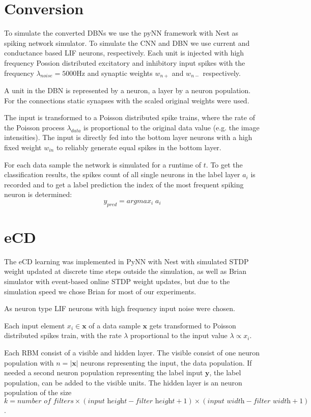 \section{Conversion}

To simulate the converted DBNs we use the pyNN framework with Nest as spiking network simulator.
To simulate the CNN and DBN we use current and conductance based LIF neurons, respectively.
Each unit is injected with high frequency Possion distributed excitatory and inhibitory input spikes with the frequency $\lambda_{noise}= 5000 \text{Hz}$ and synaptic weights $w_{n+}$ and $w_{n-}$ respectively.

A unit in the DBN is represented by a neuron, a layer by a neuron population.
For the connections static synapses with the scaled original weights were used. 

The input is transformed to a Poisson distributed spike trains, where the rate of the Poisson process $\lambda_{data}$ is proportional to the original data value (e.g. the image intensities). 
The input is directly fed into the bottom layer neurons with a high fixed weight $w_{in}$ to reliably generate equal spikes in the bottom layer.    

For each data sample the network is simulated for a runtime of $t$. 
To get the classification results, the spikes count of all single neurons in the label layer $a_i$ is recorded and to get a label prediction the index of the most frequent spiking neuron is determined:
\[
y_{pred} = argmax_i \; a_i
\]


\section{eCD}

The eCD learning was implemented in PyNN with Nest with simulated STDP weight updated at discrete time steps outside the simulation, as well as Brian simulator with event-based online STDP weight updates, but due to the simulation speed we chose Brian for most of our experiments.

As neuron type LIF neurons with high frequency input noise were chosen.

Each input element $x_i \in \textbf{x}$ of a data sample $\textbf{x}$ gets transformed to Poisson distributed spikes train, with the rate $\lambda$ proportional to the input value $\lambda \propto x_i$. 

Each RBM consist of a visible and hidden layer. 
The visible consist of one neuron population with $n = |\textbf{x}|$ neurons representing the input, the data population. 
If needed a second neuron population representing the label input $\textbf{y}$, the label population, can be added to the visible units.
The hidden layer is an neuron population of the size  $ k = \textit{number of filters} \times (\textit{input height} - \textit{filter height} + 1) \times (\textit{input width} - \textit{filter width} + 1)$.

